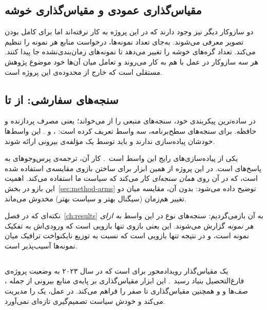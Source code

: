 \subsection{مقیاس‌گذاری عمودی و مقیاس‌گذاری خوشه}
\label{sec:bg-vpa-ca}

دو سازوکار دیگر نیز وجود دارند که در این پروژه به کار نرفته‌اند اما برای کامل بودن تصویر
معرفی می‌شوند.  به‌جای تعداد نمونه‌ها، درخواست منابع هر نمونه را
تنظیم می‌کند.  تعداد گره‌های خوشه را تغییر می‌دهد تا نمونه‌های
زمان‌بندی‌نشده جا پیدا کنند. هر سه سازوکار در عمل با هم به کار می‌روند و تعامل میان آن‌ها خود
موضوع پژوهش مستقلی است که خارج از محدوده‌ی این پروژه است.

\subsection{سنجه‌های سفارشی: از  تا }
\label{sec:bg-custom-metrics}

 در ساده‌ترین پیکربندی خود، سنجه‌های منبعی را از
 می‌خواند؛ یعنی مصرف پردازنده و حافظه. برای سنجه‌های سطح‌برنامه،
 سه واسط تعریف کرده است: ،
 و . این واسط‌ها خودشان پیاده‌سازی ندارند و
باید توسط یک مؤلفه‌ی بیرونی ارائه شوند.

 یکی از پیاده‌سازی‌های رایج این واسط است~\cite{prometheusadapter}. کار
آن، ترجمه‌ی پرس‌وجوهای  به پاسخ‌های  است. در این پروژه از
همین ابزار برای ساختن بازوی مقایسه‌ی  استفاده شده است، که در آن  روی
\emph{همان سنجه‌ای} کار می‌کند که سیاست ما استفاده می‌کند. اهمیت این بازو در
بخش~\ref{sec:method-arms} توضیح داده می‌شود: بدون آن، مقایسه میان دو تغییر هم‌زمان (سیگنال
بهتر و سیاست بهتر) مخدوش می‌ماند.

نکته‌ای که در فصل~\ref{ch:results} به آن بازمی‌گردیم: سنجه‌های نوع  در این واسط
\emph{به ازای هر نمونه} گزارش می‌شوند. این یعنی بازوی  تنها بازویی است که
ورودی‌اش به تفکیک نمونه است، و در نتیجه تنها بازویی است که نسبت به توزیع نایکنواخت ترافیک
میان نمونه‌ها آسیب‌پذیر است.

\subsection{}
\label{sec:bg-keda}

 یک مقیاس‌گذار رویدادمحور برای  است که در
سال ۲۰۲۳ به وضعیت پروژه‌ی فارغ‌التحصیل بنیاد  رسید~\cite{kedagraduation}. این ابزار
مقیاس‌گذاری بر پایه‌ی منابع بیرونی \mdash{} از جمله ، صف‌ها و
 \mdash{} و همچنین مقیاس‌گذاری تا صفر را فراهم می‌کند. در عمل،
 یک  را مدیریت می‌کند و خودش سیاست تصمیم‌گیری تازه‌ای نمی‌آورد.

